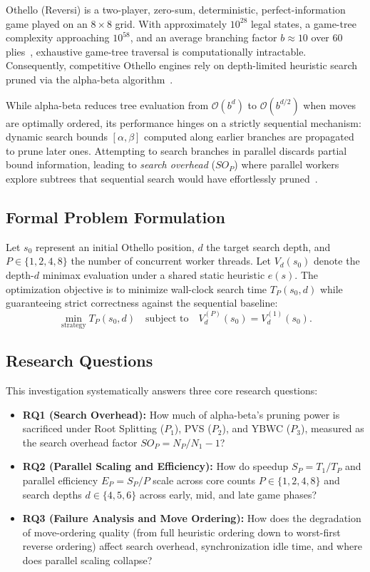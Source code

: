 \documentclass[11pt,a4paper]{article}
\begin{document}
Othello (Reversi) is a two-player, zero-sum, deterministic, perfect-information game played on an $8 \times 8$ grid. With approximately $10^{28}$ legal states, a game-tree complexity approaching $10^{58}$, and an average branching factor $b \approx 10$ over 60 plies~\cite{allis1994searching}, exhaustive game-tree traversal is computationally intractable. Consequently, competitive Othello engines rely on depth-limited heuristic search pruned via the alpha-beta algorithm~\cite{knuth1975analysis}. 

While alpha-beta reduces tree evaluation from $\mathcal{O}(b^d)$ to $\mathcal{O}(b^{d/2})$ when moves are optimally ordered, its performance hinges on a strictly sequential mechanism: dynamic search bounds $[\alpha, \beta]$ computed along earlier branches are propagated to prune later ones. Attempting to search branches in parallel discards partial bound information, leading to \textit{search overhead} ($SO_P$) where parallel workers explore subtrees that sequential search would have effortlessly pruned~\cite{marsland1982parallel, brockington1996taxonomy}.

\subsection{Formal Problem Formulation}
Let $s_0$ represent an initial Othello position, $d$ the target search depth, and $P \in \{1, 2, 4, 8\}$ the number of concurrent worker threads. Let $V_d(s_0)$ denote the depth-$d$ minimax evaluation under a shared static heuristic $e(s)$. The optimization objective is to minimize wall-clock search time $T_P(s_0, d)$ while guaranteeing strict correctness against the sequential baseline:
\begin{equation}
\min_{\text{strategy}} T_P(s_0, d) \quad \text{subject to} \quad V_d^{(P)}(s_0) = V_d^{(1)}(s_0).
\label{eq:formal_problem}
\end{equation}

\subsection{Research Questions}
This investigation systematically answers three core research questions:
\begin{itemize}
    \item \textbf{RQ1 (Search Overhead):} How much of alpha-beta's pruning power is sacrificed under Root Splitting ($P_1$), PVS ($P_2$), and YBWC ($P_3$), measured as the search overhead factor $SO_P = N_P / N_1 - 1$?
    \item \textbf{RQ2 (Parallel Scaling and Efficiency):} How do speedup $S_P = T_1 / T_P$ and parallel efficiency $E_P = S_P / P$ scale across core counts $P \in \{1, 2, 4, 8\}$ and search depths $d \in \{4, 5, 6\}$ across early, mid, and late game phases?
    \item \textbf{RQ3 (Failure Analysis and Move Ordering):} How does the degradation of move-ordering quality (from full heuristic ordering down to worst-first reverse ordering) affect search overhead, synchronization idle time, and where does parallel scaling collapse?
\end{itemize}
\end{document}
